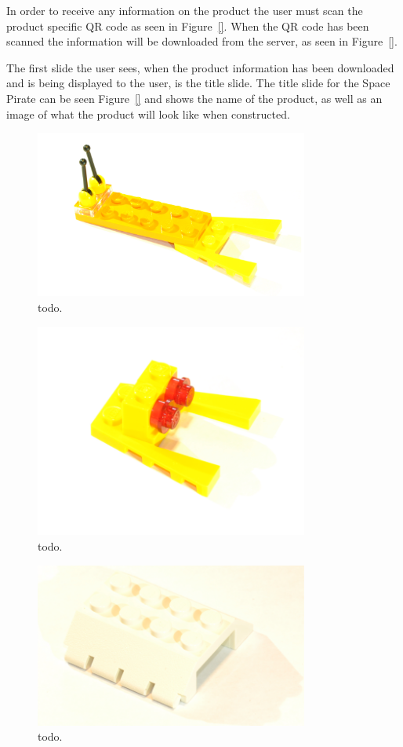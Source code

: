 In order to receive any information on the product the user must scan the product specific QR code as seen in Figure~\ref{}. When the QR code has been scanned the information will be downloaded from the server, as seen in Figure~\ref{}. 

The first slide the user sees, when the product information has been downloaded and is being displayed to the user, is the title slide. The title slide for the Space Pirate can be seen Figure~\ref{} and shows the name of the product, as well as an image of what the product will look like when constructed.





	\begin{figure}[ht!]
		\centering
		\includegraphics[width=90mm]{images/rawImages/BILD_1}
		\caption{todo.}
		\label{todo}
	\end{figure}
	
	\begin{figure}[ht!]
		\centering
		\includegraphics[width=90mm]{images/rawImages/BILD_2}
		\caption{todo.}
		\label{todo}
	\end{figure}
	
	\begin{figure}[ht!]
		\centering
		\includegraphics[width=90mm]{images/rawImages/BILD_3}
		\caption{todo.}
		\label{todo}
	\end{figure}
	
